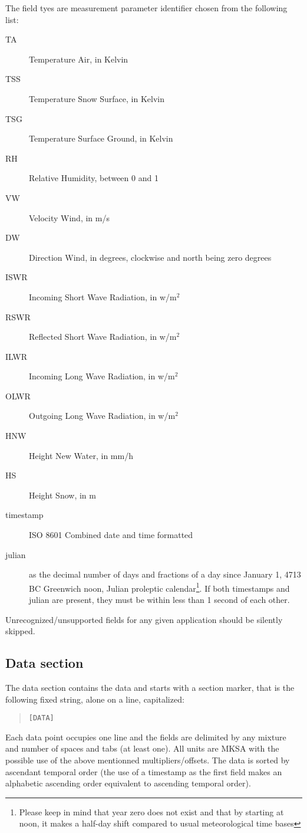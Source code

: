 \documentclass[a4paper,10pt]{article}
\begin{document}
The field tyes are measurement parameter identifier chosen from the following list: %
\begin{description}
	\item[TA] Temperature Air, in Kelvin
	\item[TSS] Temperature Snow Surface, in Kelvin
	\item[TSG] Temperature Surface Ground, in Kelvin
	\item[RH] Relative Humidity, between 0 and 1
	\item[VW] Velocity Wind, in m/s
	\item[DW] Direction Wind, in degrees, clockwise and north being zero degrees
	\item[ISWR] Incoming Short Wave Radiation, in w/m$^2$
	\item[RSWR] Reflected Short Wave Radiation, in w/m$^2$
	\item[ILWR] Incoming Long Wave Radiation, in w/m$^2$
	\item[OLWR] Outgoing Long Wave Radiation, in w/m$^2$
	\item[HNW] Height New Water, in mm/h
	\item[HS] Height Snow, in m
	\item[timestamp] ISO 8601 Combined date and time formatted
	\item[julian] as the decimal number of days and fractions of a day since January 1, 4713 BC Greenwich noon, Julian proleptic calendar\footnote{Please keep in mind that year zero does not exist and that by starting at noon, it makes a half-day shift compared to usual meteorological time bases}. If both timestamps and julian are present, they must be within less than 1 second of each other.
\end{description}
Unrecognized/unsupported fields for any given application should be silently skipped. 

\subsection{Data section}
The data section contains the data and starts with a section marker, that is the following fixed string, alone on a line, capitalized:
\begin{quote} \begin{verbatim}
[DATA]
\end{verbatim}\end{quote} 
Each data point occupies one line and the fields are delimited by any mixture and number of spaces and tabs (at least one). All units are MKSA with the possible use of the above mentionned multipliers/offsets. The data is sorted by ascendant temporal order (the use of a timestamp as the first field makes an alphabetic ascending order equivalent to ascending temporal order).
\end{document}
